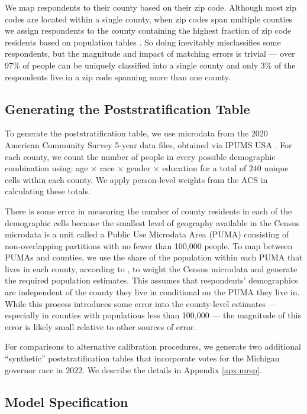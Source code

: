 We map respondents to their county based on their zip code. 
Although most zip codes are located within a single county, when zip codes span multiple counties we assign respondents to the county containing the highest fraction of zip code residents based on population tables \citep{Geocorr}. 
So doing inevitably misclassifies some respondents, but the magnitude and impact of matching errors is trivial --- over 97\% of people can be uniquely classified into a single county and only 3\% of the respondents live in a zip code spanning more than one county.%


\subsection{Generating the Poststratification Table}
\label{apx:poststrat}
To generate the poststratification table, we use microdata from the 2020 American Community Survey 5-year data files, obtained via IPUMS USA \citep{IPUMS}.
For each county, we count the number of people in every possible demographic combination using: age $\times$ race $\times$ gender $\times$ education for a total of $240$ unique cells within each county. 
We apply person-level weights from the ACS in calculating these totals.

There is some error in measuring the number of county residents in each of the demographic cells because the smallest level of geography available in the Census microdata is a unit called a Public Use Microdata Area (PUMA) consisting of non-overlapping partitions with no fewer than 100,000 people. 
To map between PUMAs and counties, we use the share of the population within each PUMA that lives in each county, according to  \citet{Geocorr}, to weight the Census microdata and generate the required population estimates. 
This assumes that respondents' demographics are independent of the county they live in conditional on the PUMA they live in. 
While this process introduces some error into the county-level estimates --- especially in counties with populations less than 100,000 --- the magnitude of this error is likely small relative to other sources of error.

For comparisons to alternative calibration procedures, we generate two additional ``synthetic'' poststratification tables that incorporate votes for the Michigan governor race in 2022. We describe the details in Appendix \ref{apx:mrsp}.

\subsection{Model Specification}

